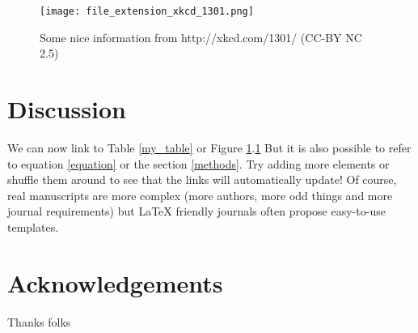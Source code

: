 \documentclass[12pt,letterpaper]{article}
\begin{document}
\begin{figure}[!htpb]
\centering
    \texttt{[image: file\_extension\_xkcd\_1301.png]} %
\caption{Some nice information from http://xkcd.com/1301/ (CC-BY NC 2.5)} %
\label{my_figure}
\end{figure}

\newpage %

\section{Discussion}
We can now link to Table \ref{my_table} or Figure \ref{my_figure}.\ref{my_figure}
But it is also possible to refer to equation \ref{equation} or the section \ref{methods}.
Try adding more elements or shuffle them around to see that the links will automatically update!
Of course, real manuscripts are more complex (more authors, more odd things and more journal requirements) but LaTeX friendly journals often propose easy-to-use templates.

\section{Acknowledgements}
Thanks folks






\end{document}
